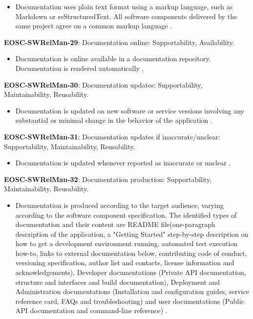 \begin{itemize}
    \item Documentation uses plain text format using a markup language, such as Markdown or reStructuredText. All software components delivered by the same project agree on a common markup language \cite{orviz_set_2017,raymond_software_2013}.
\end{itemize}

\textbf{EOSC-SWRelMan-29}: Documentation online: Supportability, Availability.

\begin{itemize}
    \item Documentation is online available in a documentation repository. Documentation is rendered automatically \cite{orviz_set_2017,orviz_fernandez_eosc-synergy_2020}.
\end{itemize}

\textbf{EOSC-SWRelMan-30}: Documentation updates: Supportability, Maintainability, Reusability.

\begin{itemize}
    \item Documentation is updated on new software or service versions involving any substantial or minimal change in the behavior of the application \cite{orviz_set_2017,orviz_fernandez_eosc-synergy_2020,raymond_software_2013}.
\end{itemize}

\textbf{EOSC-SWRelMan-31}: Documentation updates if inaccurate/unclear: Supportability, Maintainability, Reusability.

\begin{itemize}
    \item Documentation is updated whenever reported as inaccurate or unclear \cite{orviz_set_2017,orviz_fernandez_eosc-synergy_2020}.
\end{itemize}

\textbf{EOSC-SWRelMan-32}: Documentation production: Supportability, Maintainability, Reusability.

\begin{itemize}
    \item Documentation is produced according to the target audience, varying according to the software component specification. The identified types of documentation and their content are README file(one-paragraph description of the application, a "Getting Started" step-by-step description on how to get a development environment running, automated test execution how-to, links to external documentation below, contributing code of conduct, versioning specification, author list and contacts, license information and acknowledgements), Developer documentations (Private API documentation, structure and interfaces and build documentation), Deployment and Administration documentations (Installation and configuration guides, service reference card, FAQs and troubleshooting) and user documentations (Public API documentation and command-line reference) \cite{aberdour_achieving_2007,shepherdson_cessda_2019,orviz_set_2017,orviz_fernandez_eosc-synergy_2020,raymond_software_2013}.
\end{itemize}

